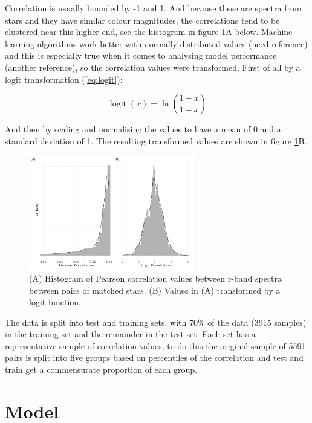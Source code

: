 \documentclass[a4paper,fleqn,usenatbib]{mnras}
\begin{document}
Correlation is usually bounded by -1 and 1. And because these are
spectra from stars and they have similar colour magnitudes, the
correlations tend to be clustered near this higher end, see the
histogram in figure \ref{fig:histograms}A below. Machine learning
algorithms work better with normally distributed values (need reference)
and this is especially true when it comes to analysing model performance
(another reference), so the correlation values were transformed. First
of all by a logit transformation (\ref{eq:logit}):

\begin{equation}
  \displaystyle \operatorname {logit} (x)=\ln \left({\frac {1+x}{1-x}}\right)
  \label{eq:logit}
\end{equation}

And then by scaling and normalising the values to have a mean of 0 and a
standard deviation of 1. The resulting transformed values are shown in
figure \ref{fig:histograms}B.

\begin{figure}
  \includegraphics[width=\columnwidth, height = 5cm]{figures/histograms}
    \caption{(A) Histogram of Pearson correlation values between r-band spectra between pairs of matched stars. (B) Values in (A) transformed by a logit function.}
    \label{fig:histograms}
\end{figure}

The data is split into test and training sets, with 70\% of the data
(3915 samples) in the training set and the remainder in the test set.
Each set has a representative sample of correlation values, to do this
the original sample of 5591 pairs is split into five groups based on
percentiles of the correlation and test and train get a commensurate
proportion of each group.

\hypertarget{model}{%
\section{Model}\label{model}}
\end{document}
